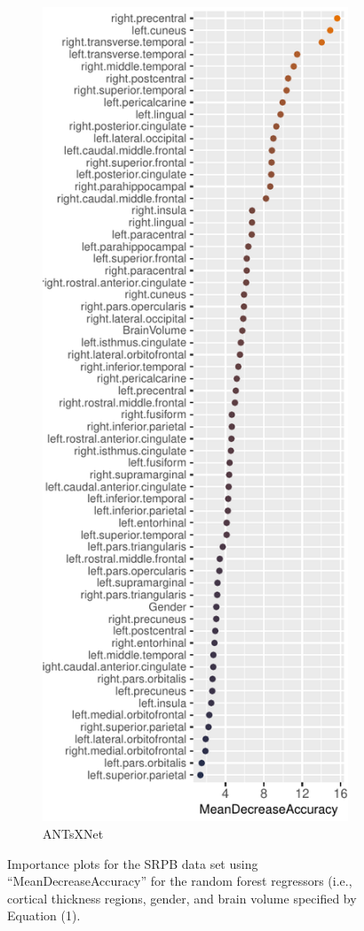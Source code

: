 \documentclass[12pt,]{article}
\begin{document}
\begin{figure}[htb]
\begin{subfigure}{0.4\textwidth}
    \includegraphics[width=0.7\linewidth]{Figures/rfImportance_SRPB1600_ANTsXNet.pdf}
    \caption{ANTsXNet}
  \end{subfigure}
\caption{Importance plots for the SRPB data set using ``MeanDecreaseAccuracy'' for the
random forest regressors (i.e., cortical thickness regions, gender, and brain volume
specified by Equation (1).}
\label{fig:rfimportance}
\end{figure}
\end{document}
